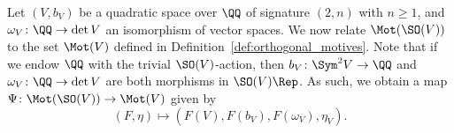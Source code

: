 %    
%
%

Let $(V,b_V)$ be a quadratic space over $\QQ$ of signature $(2,n)$ with $n \geq 1$, and $\omega_V\colon \QQ \rightarrow \det V$ an isomorphism of vector spaces. We now relate $\Mot(\SO(V))$ to the set $\Mot(V)$ defined in Definition~\ref{def:orthogonal_motives}. Note that if we endow $\QQ$ with the trivial $\SO(V)$-action, then $b_V\colon \Sym^2 V \rightarrow \QQ$ and $\omega_V\colon \QQ \rightarrow \det V$ are both morphisms in $\SO(V)\Rep$. As such, we obtain a map $\Psi\colon \Mot(\SO(V)) \rightarrow \Mot(V)$ given by
$$
(F,\eta) \longmapsto (F(V), F(b_V), F(\omega_V), \eta_V).
$$

